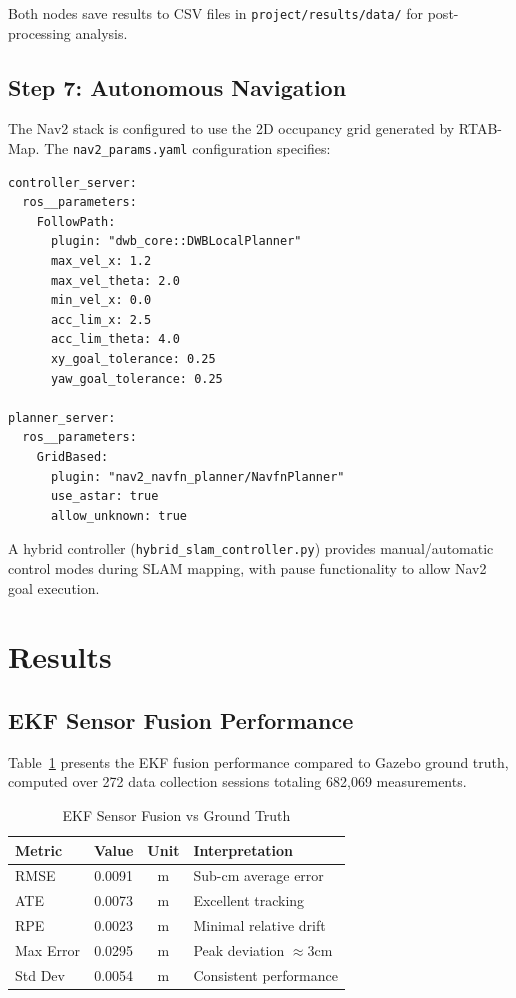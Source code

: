 \documentclass[conference]{IEEEtran}
\begin{document}
Both nodes save results to CSV files in \texttt{project/results/data/} for post-processing analysis.

\subsection{Step 7: Autonomous Navigation}

The Nav2 stack is configured to use the 2D occupancy grid generated by RTAB-Map. The \texttt{nav2\_params.yaml} configuration specifies:

\begin{lstlisting}[caption={Nav2 Configuration (nav2\_params.yaml)}]
controller_server:
  ros__parameters:
    FollowPath:
      plugin: "dwb_core::DWBLocalPlanner"
      max_vel_x: 1.2
      max_vel_theta: 2.0
      min_vel_x: 0.0
      acc_lim_x: 2.5
      acc_lim_theta: 4.0
      xy_goal_tolerance: 0.25
      yaw_goal_tolerance: 0.25

planner_server:
  ros__parameters:
    GridBased:
      plugin: "nav2_navfn_planner/NavfnPlanner"
      use_astar: true
      allow_unknown: true
\end{lstlisting}

A hybrid controller (\texttt{hybrid\_slam\_controller.py}) provides manual/automatic control modes during SLAM mapping, with pause functionality to allow Nav2 goal execution.

\section{Results}

\subsection{EKF Sensor Fusion Performance}

Table~\ref{tab:ekf_results} presents the EKF fusion performance compared to Gazebo ground truth, computed over 272 data collection sessions totaling 682,069 measurements.

\begin{table}[htbp]
\caption{EKF Sensor Fusion vs Ground Truth}
\begin{center}
\begin{tabular}{|l|c|c|l|}
\hline
\textbf{Metric} & \textbf{Value} & \textbf{Unit} & \textbf{Interpretation} \\
\hline
RMSE & 0.0091 & m & Sub-cm average error \\
ATE & 0.0073 & m & Excellent tracking \\
RPE & 0.0023 & m & Minimal relative drift \\
Max Error & 0.0295 & m & Peak deviation $\approx$3cm \\
Std Dev & 0.0054 & m & Consistent performance \\
\hline
\end{tabular}
\label{tab:ekf_results}
\end{center}
\end{table}
\end{document}
